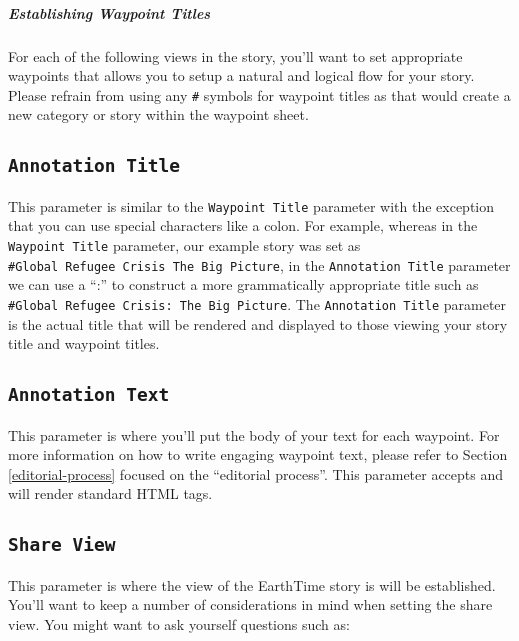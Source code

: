 \documentclass[
]{krantz}
\begin{document}
\hypertarget{establishing-waypoint-titles}{%
\subparagraph*{Establishing Waypoint Titles}\label{establishing-waypoint-titles}}

For each of the following views in the story, you'll want to set appropriate waypoints that allows you to setup a natural and logical flow for your story. Please refrain from using any \texttt{\#} symbols for waypoint titles as that would create a new category or story within the waypoint sheet.

\hypertarget{annotation-title}{%
\subsection*{\texorpdfstring{\texttt{Annotation\ Title}}{Annotation Title}}\label{annotation-title}}


This parameter is similar to the \texttt{Waypoint\ Title} parameter with the exception that you can use special characters like a colon. For example, whereas in the \texttt{Waypoint\ Title} parameter, our example story was set as \texttt{\#Global\ Refugee\ Crisis\ The\ Big\ Picture}, in the \texttt{Annotation\ Title} parameter we can use a ``:'' to construct a more grammatically appropriate title such as \texttt{\#Global\ Refugee\ Crisis:\ The\ Big\ Picture}. The \texttt{Annotation\ Title} parameter is the actual title that will be rendered and displayed to those viewing your story title and waypoint titles.

\hypertarget{annotation-text}{%
\subsection*{\texorpdfstring{\texttt{Annotation\ Text}}{Annotation Text}}\label{annotation-text}}


This parameter is where you'll put the body of your text for each waypoint. For more information on how to write engaging waypoint text, please refer to Section \ref{editorial-process} focused on the ``editorial process''. This parameter accepts and will render standard HTML tags.

\hypertarget{share-view}{%
\subsection*{\texorpdfstring{\texttt{Share\ View}}{Share View}}\label{share-view}}


This parameter is where the view of the EarthTime story is will be established. You'll want to keep a number of considerations in mind when setting the share view. You might want to ask yourself questions such as:
\end{document}
